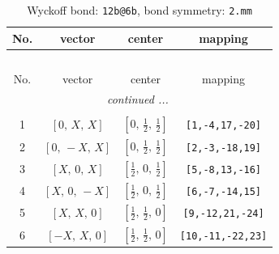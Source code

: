 \documentclass[fleqn,8pt]{jsarticle}
\begin{document}
\renewcommand{\arraystretch}{1.2}
\begin{longtable}{cccc}
\caption{Wyckoff bond: {\tt 12b@6b}, bond symmetry: {\tt 2.mm}}
 \\
 \hline \hline
No. & vector & center & mapping \\ \hline \endfirsthead

\multicolumn{3}{l}{\tablename\ \thetable{}} \\
 \hline \hline
No. & vector & center & mapping \\ \hline \endhead

 \hline \hline
\multicolumn{3}{r}{\footnotesize\it continued ...} \\ \endfoot

 \hline \hline
\multicolumn{3}{r}{} \\ \endlastfoot

1 & $\left[ 0,\, X,\, X \right]$ & $\left[ 0,\, \frac{1}{2},\, \frac{1}{2} \right]$ & {\tt [1,-4,17,-20]} \\ \hline
2 & $\left[ 0,\, - X,\, X \right]$ & $\left[ 0,\, \frac{1}{2},\, \frac{1}{2} \right]$ & {\tt [2,-3,-18,19]} \\ \hline
3 & $\left[ X,\, 0,\, X \right]$ & $\left[ \frac{1}{2},\, 0,\, \frac{1}{2} \right]$ & {\tt [5,-8,13,-16]} \\ \hline
4 & $\left[ X,\, 0,\, - X \right]$ & $\left[ \frac{1}{2},\, 0,\, \frac{1}{2} \right]$ & {\tt [6,-7,-14,15]} \\ \hline
5 & $\left[ X,\, X,\, 0 \right]$ & $\left[ \frac{1}{2},\, \frac{1}{2},\, 0 \right]$ & {\tt [9,-12,21,-24]} \\ \hline
6 & $\left[ - X,\, X,\, 0 \right]$ & $\left[ \frac{1}{2},\, \frac{1}{2},\, 0 \right]$ & {\tt [10,-11,-22,23]} \\
\end{longtable}
\renewcommand{\arraystretch}{1.2}
\end{document}

